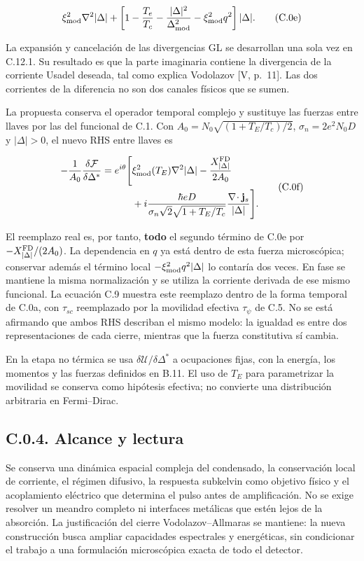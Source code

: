 \documentclass[
  spanish,
  10pt,
  a4paper,
]{article}
\begin{document}
\[
\xi_{\rm mod}^2\nabla^2|\Delta|
+\left[1-\frac{T_e}{T_c}
-\frac{|\Delta|^2}{\Delta_{\rm mod}^2}
-\xi_{\rm mod}^2q^2\right]|\Delta|.
\tag{C.0e}
\]

La expansión y cancelación de las divergencias GL se desarrollan una
sola vez en C.12.1. Su resultado es que la parte imaginaria contiene la
divergencia de la corriente Usadel deseada, tal como explica Vodolazov
{[}V, p.~11{]}. Las dos corrientes de la diferencia no son dos canales
físicos que se sumen.

La propuesta conserva el operador temporal complejo y sustituye las
fuerzas entre llaves por las del funcional de C.1. Con
\(A_0=N_0\sqrt{(1+T_E/T_c)/2}\), \(\sigma_n=2e^2N_0D\) y \(|\Delta|>0\),
el nuevo RHS entre llaves es

\[
\begin{aligned}
-\frac1{A_0}\frac{\delta\mathcal F}{\delta\Delta^*}
=e^{i\theta}\Bigg[
&\xi_{\rm mod}^2(T_E)\nabla^2|\Delta|
-\frac{X_{|\Delta|}^{\rm FD}}{2A_0}\\
&+i\frac{\hbar eD}
{\sigma_n\sqrt2\sqrt{1+T_E/T_c}}
\frac{\nabla\!\cdot\mathbf j_s}{|\Delta|}
\Bigg].
\end{aligned}
\tag{C.0f}
\]

El reemplazo real es, por tanto, \textbf{todo} el segundo término de
C.0e por \(-X_{|\Delta|}^{\rm FD}/(2A_0)\). La dependencia en \(q\) ya
está dentro de esta fuerza microscópica; conservar además el término
local \(-\xi_{\rm mod}^2q^2|\Delta|\) lo contaría dos veces. En fase se
mantiene la misma normalización y se utiliza la corriente derivada de
ese mismo funcional. La ecuación C.9 muestra este reemplazo dentro de la
forma temporal de C.0a, con \(\tau_{sc}\) reemplazado por la movilidad
efectiva \(\tau_\psi\) de C.5. No se está afirmando que ambos RHS
describan el mismo modelo: la igualdad es entre dos representaciones de
cada cierre, mientras que la fuerza constitutiva sí cambia.

En la etapa no térmica se usa \(\delta\mathcal U/\delta\Delta^*\) a
ocupaciones fijas, con la energía, los momentos y las fuerzas definidos
en B.11. El uso de \(T_E\) para parametrizar la movilidad se conserva
como hipótesis efectiva; no convierte una distribución arbitraria en
Fermi--Dirac.

\subsection{C.0.4. Alcance y lectura}\label{c.0.4.-alcance-y-lectura}

Se conserva una dinámica espacial compleja del condensado, la
conservación local de corriente, el régimen difusivo, la respuesta
subkelvin como objetivo físico y el acoplamiento eléctrico que determina
el pulso antes de amplificación. No se exige resolver un meandro
completo ni interfaces metálicas que estén lejos de la absorción. La
justificación del cierre Vodolazov--Allmaras se mantiene: la nueva
construcción busca ampliar capacidades espectrales y energéticas, sin
condicionar el trabajo a una formulación microscópica exacta de todo el
detector.
\end{document}
